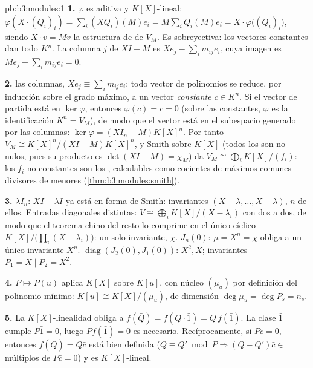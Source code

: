 \begin{solution}{pb:b3:modules:1}
\textbf{1.} $\varphi$ es aditiva y $K[X]$-lineal: $\varphi(X
\cdot (Q_i)_i) = \sum_i (XQ_i)(M)e_i = M\sum_i Q_i(M)e_i = X
\cdot \varphi\bigl((Q_i)_i\bigr)$, siendo $X \cdot v = Mv$ la estructura
de  de $V_M$. Es sobreyectiva: los
vectores constantes dan todo $K^n$. La columna $j$ de $XI - M$ es
$Xe_j - \sum_i
m_{ij}e_i$, cuya imagen es $Me_j - \sum_i m_{ij}e_i = 0$.

\textbf{2.}  las columnas, $Xe_j \equiv \sum_i m_{ij}e_i$: todo
vector de polinomios se reduce, por inducción sobre el grado máximo, a
un vector \emph{constante} $c \in K^n$. Si el vector de partida está en
$\ker\varphi$, entonces $\varphi(c) = c = 0$ (sobre las constantes,
$\varphi$ es la identificación $K^n = V_M$), de modo que el vector está
en el subespacio generado por las columnas: $\ker\varphi = (XI_n -
M)K[X]^n$. Por tanto $V_M \cong K[X]^n/(XI - M)K[X]^n$, y Smith sobre
$K[X]$ (todos los 
son no nulos, pues su producto es $\det(XI - M) = \chi_M$) da
$V_M \cong \bigoplus_i
K[X]/(f_i)$: los $f_i$ no constantes son los
, calculables
como cocientes de máximos comunes divisores de menores
(\cref{thm:b3:modules:smith}).

\textbf{3.} $\lambda I_n$: $XI - \lambda I$ ya está en forma de Smith:
invariantes $(X - \lambda, \dots, X - \lambda)$, $n$ de ellos. Entradas
diagonales distintas: $V \cong \bigoplus_i K[X]/(X -
\lambda_i)$ con   dos a
dos, de modo que el teorema chino del resto lo comprime en el único
cíclico $K[X]/\bigl(\prod_i(X - \lambda_i)\bigr)$: un solo invariante,
$\chi$. $J_n(0)$: $\mu = X^n = \chi$ obliga a un único invariante $X^n$.
$\operatorname{diag}(J_2(0), J_1(0))$:
 $X^2, X$;
invariantes $P_1 = X \mid P_2 =
X^2$.

\textbf{4.} $P \mapsto P(u)$ aplica $K[X]$ sobre $K[u]$, con núcleo
$(\mu_u)$ por definición del polinomio mínimo: $K[u]
\cong K[X]/(\mu_u)$, de dimensión $\deg\mu_u = \deg P_s = n_s$.

\textbf{5.} La $K[X]$-linealidad obliga a $f(\bar Q) = f(Q\cdot\bar 1)
= Q\,f(\bar 1)$. La clase $\bar 1$ cumple $P \bar 1 = 0$, luego
$P f(\bar 1) = 0$ es necesario. Recíprocamente, si $P\bar c = 0$,
entonces $f(\bar Q) = Q\bar c$ está bien definida ($Q \equiv Q' \bmod P
\Rightarrow (Q - Q')\bar c \in$ múltiplos de $P\bar c = 0$) y es
$K[X]$-lineal.


\end{solution}
